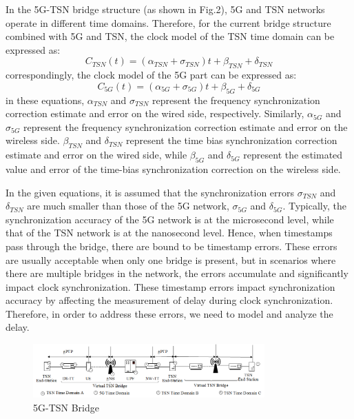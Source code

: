 \documentclass[english]{cccconf}
\begin{document}
In the 5G-TSN bridge structure (as shown in Fig.2), 5G and TSN networks operate in different time domains. Therefore, for the current bridge structure combined with 5G and TSN, the clock model of the TSN time domain can be expressed as:
\begin{equation}
	C_{TSN}(t) = (\alpha_{TSN}+\sigma_{TSN})t + \beta _{TSN} +\delta_{TSN}
\end{equation}
 correspondingly, the clock model of the 5G part can be expressed as:
 \begin{equation}
 	C_{5G}(t) = (\alpha_{5G}+\sigma_{5G})t + \beta _{5G} +\delta_{5G}
 \end{equation}
in these equations, $\alpha_{TSN}$ and $\sigma_{TSN}$ represent the frequency synchronization correction estimate and error on the wired side, respectively. Similarly, $\alpha_{5G}$ and $\sigma_{5G}$ represent the frequency synchronization correction estimate and error on the wireless side. $\beta_{TSN}$ and $\delta_{TSN}$ represent the time bias synchronization correction estimate and error on the wired side, while $\beta_{5G}$ and $\delta_{5G}$ represent the estimated value and error of the time-bias synchronization correction on the wireless side. 

In the given equations, it is assumed that the synchronization errors $\sigma_{TSN}$ and $\delta_{TSN}$ are much smaller than those of the 5G network, $\sigma_{5G}$ and $\delta_{5G}$. Typically, the synchronization accuracy of the 5G network is at the microsecond level, while that of the TSN network is at the nanosecond level. Hence, when timestamps pass through the bridge, there are bound to be timestamp errors. These errors are usually acceptable when only one bridge is present, but in scenarios where there are multiple bridges in the network, the errors accumulate and significantly impact clock synchronization. These timestamp errors impact synchronization accuracy by affecting the measurement of delay during clock synchronization. Therefore, in order to address these errors, we need to model and analyze the delay.
\begin{figure}[htbp]
	\centering
	\setcounter{figure}{1}
	\includegraphics[width=3.5in]{fig12.png}
	\caption{5G-TSN Bridge}
\end{figure}
\end{document}
